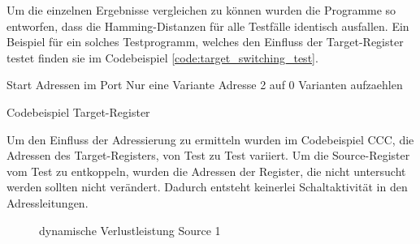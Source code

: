 Um die einzelnen Ergebnisse vergleichen zu können wurden die Programme so entworfen, dass die Hamming-Distanzen für alle Testfälle identisch ausfallen. Ein Beispiel für ein solches Testprogramm, welches den Einfluss der Target-Register testet finden sie im Codebeispiel \ref{code:target_switching_test}.

Start Adressen im Port
Nur eine Variante Adresse 2 auf 0
Varianten aufzaehlen


\begin{algorithm}[H]
	\begin{algorithmic}[1]
		\caption{Codebeispiel Target-Register }
		\label{code:target_switching_test}
	\end{algorithmic}
\end{algorithm}


Um den Einfluss der Adressierung zu ermitteln wurden im Codebeispiel CCC, die Adressen des Target-Registers, von Test zu Test variiert. Um die Source-Register vom Test zu entkoppeln, wurden die Adressen der Register, die nicht untersucht werden sollten nicht verändert. Dadurch entsteht keinerlei Schaltaktivität in den Adressleitungen.

\begin{figure}
	\centering
	
	\caption{dynamische Verlustleistung Source 1}
\end{figure}

